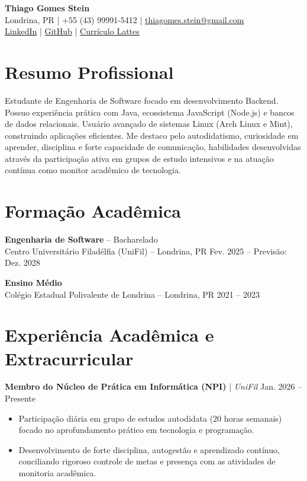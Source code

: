 \documentclass[11pt,a4paper]{article}
\begin{document}
\begin{center}
    {\Huge \textbf{Thiago Gomes Stein}} \\
    \vspace{2mm}
    Londrina, PR | +55 (43) 99991-5412 | \href{mailto:thiagomes.stein@gmail.com}{thiagomes.stein@gmail.com} \\
    \vspace{1mm}
    \href{https://www.linkedin.com/in/thiago-gomes-stein-31649a35b/}{LinkedIn} | \href{https://github.com/Thiago-Stein}{GitHub} | \href{https://lattes.cnpq.br/0305313799581622}{Currículo Lattes}
\end{center}

\vspace{4mm}

\section*{Resumo Profissional}
Estudante de Engenharia de Software focado em desenvolvimento Backend. Possuo experiência prática com Java, ecossistema JavaScript (Node.js) e bancos de dados relacionais. Usuário avançado de sistemas Linux (Arch Linux e Mint), construindo aplicações eficientes. Me destaco pelo autodidatismo, curiosidade em aprender, disciplina e forte capacidade de comunicação, habilidades desenvolvidas através da participação ativa em grupos de estudo intensivos e na atuação contínua como monitor acadêmico de tecnologia.

\section*{Formação Acadêmica}
\textbf{Engenharia de Software} -- Bacharelado \\
Centro Universitário Filadélfia (UniFil) -- Londrina, PR \hfill Fev. 2025 -- Previsão: Dez. 2028

\textbf{Ensino Médio} \\
Colégio Estadual Polivalente de Londrina -- Londrina, PR \hfill 2021 -- 2023

\section*{Experiência Acadêmica e Extracurricular}

\textbf{Membro do Núcleo de Prática em Informática (NPI)} | \textit{UniFil} \hfill Jan. 2026 -- Presente
\begin{itemize}[leftmargin=*]
    \item Participação diária em grupo de estudos autodidata (20 horas semanais) focado no aprofundamento prático em tecnologia e programação.
    \item Desenvolvimento de forte disciplina, autogestão e aprendizado contínuo, conciliando rigoroso controle de metas e presença com as atividades de monitoria acadêmica.
\end{itemize}
\end{document}
